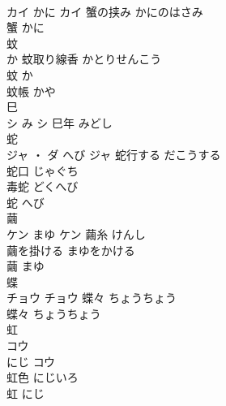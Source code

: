 \documentclass[8pt]{extreport}
\begin{document}
\begin{CJK}{UTF8}{min}
\\	カイ	かに	カイ	蟹の挟み	かにのはさみ	
\\	蟹	かに	
\\	蚊	
\\	か		蚊取り線香	かとりせんこう	
\\	蚊	か	
\\	蚊帳	かや	
\\	巳	
\\	シ	み	シ	巳年	みどし	
\\	蛇	
\\	ジャ ・ ダ	へび	ジャ	蛇行する	だこうする	
\\	蛇口	じゃぐち	
\\	毒蛇	どくへび	
\\	蛇	へび	
\\	繭	
\\	ケン	まゆ	ケン	繭糸	けんし	
\\	繭を掛ける	まゆをかける	
\\	繭	まゆ	
\\	蝶	
\\	チョウ		チョウ	蝶々	ちょうちょう	
\\	蝶々	ちょうちょう	
\\	虹	
\\	コウ
\\	にじ	コウ
\\	虹色	にじいろ	
\\	虹	にじ	
\end{CJK}
\end{document}

